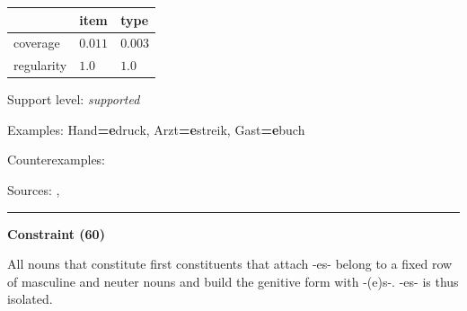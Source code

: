 \vspace{-0.25em}

\begin{table}[!ht]
\begin{center}
\setlength{\extrarowheight}{1pt}
\begin{tabularx}{\columnwidth}{|X|X|X|}
\hline
 & item & type \\
\hline
 coverage & $0.011$ & $0.003$ \\
\hline
 regularity & $1.0$ & $1.0$ \\
\hline
\end{tabularx}
\end{center}
\end{table}

\vspace{-1.35em}

\noindent
Support level: \textit{supported}

\vspace{0.3em}

\noindent
Examples: Hand\textbf{=e}druck, Arzt\textbf{=e}streik, Gast\textbf{=e}buch

\noindent
Counterexamples: 

\vspace{0.3em}

\noindent
Sources: \citet[228]{eisenberg_2013}, \citet[5]{nuebling_szczepaniak_2008}

\vspace{0.35em}
\hrule




\vspace{0.4em}

\begin{center}
\textbf{Constraint (60)}
\end{center}

\noindent
All nouns that constitute first constituents that attach -es- belong to a fixed row of masculine and neuter nouns and build the genitive form with -(e)s-. -es- is thus isolated.
\vspace{0.5em}


